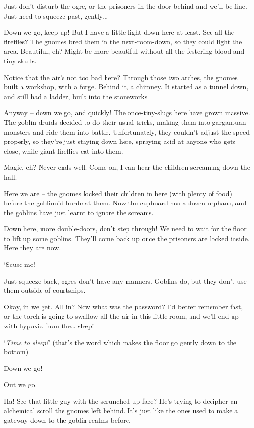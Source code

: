 \begin{multicols}{2}
\begin{exampletext}
Just don't disturb the ogre, or the prisoners in the door behind and we'll be fine.
Just need to squeeze past, gently\ldots

Down we go, keep up!
But I have a little light down here at least.
See all the fireflies?
The gnomes bred them in the next-room-down, so they could light the area.
Beautiful, eh?
Might be more beautiful without all the festering blood and tiny skulls.

Notice that the air's not too bad here?
Through those two arches, the gnomes built a workshop, with a forge.
Behind it, a chimney.
It started as a tunnel down, and still had a ladder, built into the stoneworks.

Anyway -- down we go, and quickly!
The once-tiny-slugs here have grown massive.
The goblin druids decided to do their usual tricks, making them into gargantuan monsters and ride them into battle.
Unfortunately, they couldn't adjust the speed properly, so they're just staying down here, spraying acid at anyone who gets close, while giant fireflies eat into them.

Magic, eh?
Never ends well.
Come on, I can hear the children screaming down the hall.

Here we are -- the gnomes locked their children in here (with plenty of food) before the goblinoid horde at them.
Now the cupboard has a dozen orphans, and the goblins have just learnt to ignore the screams.

Down here, more double-doors, don't step through!
We need to wait for the floor to lift up some goblins.
They'll come back up once the prisoners are locked inside.
Here they are now.

`Scuse me!

Just squeeze back, ogres don't have any manners.
Goblins do, but they don't use them outside of courtships.

Okay, in we get.
All in?
Now what was the password?
I'd better remember fast, or the torch is going to swallow all the air in this little room, and we'll end up with hypoxia from the\ldots
sleep!

`\textit{Time to sleep!}'
(that's the word which makes the floor go gently down to the bottom)

Down we go!

Out we go.

Ha!
See that little guy with the scrunched-up face?
He's trying to decipher an alchemical scroll the gnomes left behind.
It's just like the ones used to make a gateway down to the goblin realms before.


\end{exampletext}
\end{multicols}
